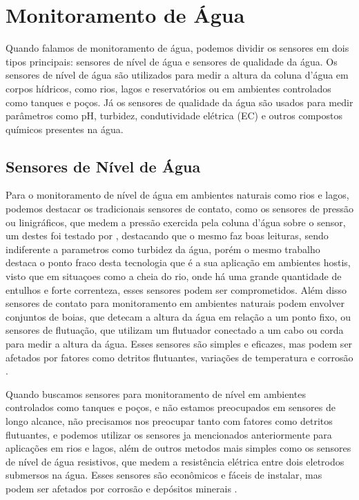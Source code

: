 \documentclass[conference]{IEEEtran}
\begin{document}
\section{Monitoramento de Água}\label{sec:water_monitoring}

Quando falamos de monitoramento de água, podemos dividir os sensores em dois tipos principais: sensores de nível de água e sensores de qualidade da água. Os sensores de nível de água são utilizados para medir a altura da coluna d'água em corpos hídricos, como rios, lagos e reservatórios ou em ambientes controlados como tanques e poços. Já os sensores de qualidade da água são usados para medir parâmetros como pH, turbidez, condutividade elétrica (EC) e outros compostos químicos presentes na água.

\subsection{Sensores de Nível de Água}\label{subsec:water_level_sensors}

Para o monitoramento de nível de água em ambientes naturais como rios e lagos, podemos destacar os tradicionais sensores de contato, como os sensores de pressão ou linigráficos, que medem a pressão exercida pela coluna d'água sobre o sensor, um destes foi testado por \textcite{santana_2024_development}, destacando que o mesmo faz boas leituras, sendo indiferente a parametros como turbidez da água, porém o mesmo trabalho destaca o ponto fraco desta tecnologia que é a sua aplicação em ambientes hostis, visto que em situaçoes como a cheia do rio, onde há uma grande quantidade de entulhos e forte correnteza, esses sensores podem ser comprometidos. Além disso sensores de contato para monitoramento em ambientes naturais podem envolver conjuntos de boias, que detecam a altura da água em relação a um ponto fixo, ou sensores de flutuação, que utilizam um flutuador conectado a um cabo ou corda para medir a altura da água. Esses sensores são simples e eficazes, mas podem ser afetados por fatores como detritos flutuantes, variações de temperatura e corrosão \cite{mohammadrezamasoudimoghaddam_2024_a,santana_2024_development,paul_2020_a,yukawa_2025_an} .

Quando buscamos sensores para monitoramento de nível em ambientes controlados como tanques e poços, e não estamos preocupados em sensores de longo alcance, não precisamos nos preocupar tanto com fatores como detritos flutuantes, e podemos utilizar os sensores ja mencionados anteriormente para aplicações em rios e lagos, além de outros metodos mais simples como os sensores de nível de água resistivos, que medem a resistência elétrica entre dois eletrodos submersos na água. Esses sensores são econômicos e fáceis de instalar, mas podem ser afetados por corrosão e depósitos minerais \cite{santana_2024_development, mohindru_2023_development}.
\end{document}
